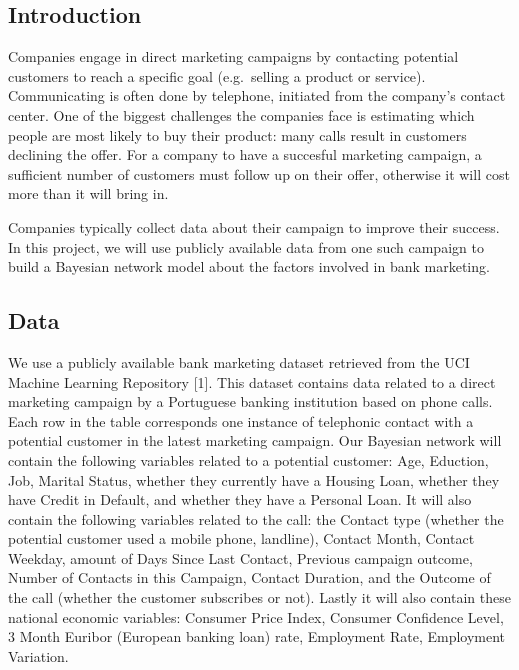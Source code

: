 \documentclass[11pt,]{article}
\begin{document}
\begin{multicols}{2}
\tableofcontents

\hypertarget{introduction}{%
\section{Introduction}\label{introduction}}

Companies engage in direct marketing campaigns by contacting potential
customers to reach a specific goal (e.g.~selling a product or service).
Communicating is often done by telephone, initiated from the company's
contact center. One of the biggest challenges the companies face is
estimating which people are most likely to buy their product: many calls
result in customers declining the offer. For a company to have a
succesful marketing campaign, a sufficient number of customers must
follow up on their offer, otherwise it will cost more than it will bring
in.

Companies typically collect data about their campaign to improve their
success. In this project, we will use publicly available data from one
such campaign to build a Bayesian network model about the factors
involved in bank marketing.

\hypertarget{data}{%
\subsection{Data}\label{data}}

We use a publicly available bank marketing dataset retrieved from the
UCI Machine Learning Repository {[}1{]}. This dataset contains data
related to a direct marketing campaign by a Portuguese banking
institution based on phone calls. Each row in the table corresponds one
instance of telephonic contact with a potential customer in the latest
marketing campaign. Our Bayesian network will contain the following
variables related to a potential customer: Age, Eduction, Job, Marital
Status, whether they currently have a Housing Loan, whether they have
Credit in Default, and whether they have a Personal Loan. It will also
contain the following variables related to the call: the Contact type
(whether the potential customer used a mobile phone, landline), Contact
Month, Contact Weekday, amount of Days Since Last Contact, Previous
campaign outcome, Number of Contacts in this Campaign, Contact Duration,
and the Outcome of the call (whether the customer subscribes or not).
Lastly it will also contain these national economic variables: Consumer
Price Index, Consumer Confidence Level, 3 Month Euribor (European
banking loan) rate, Employment Rate, Employment Variation.


\end{multicols}
\end{document}
